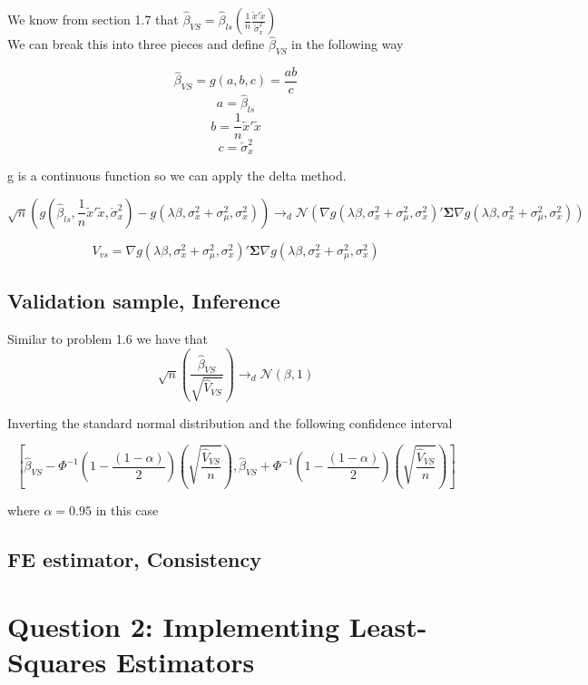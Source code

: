 \documentclass[11pt]{article}
\begin{document}
We know from section 1.7 that  $\hat{\beta}_{VS} = \hat{\beta}_{ls}\left(\frac{1}{n}\frac{\tilde{x}'\tilde{x}}{\check{\sigma}_x^2} \right)$ \\

We can break this into three pieces and define $\hat{\beta}_{VS}$ in the following way 

$$\hat{\beta}_{VS} = g(a,b,c) = \frac{ab}{c} $$
$$ a = \hat{\beta}_{ls} $$
$$ b = \frac{1}{n}\tilde{x}'\tilde{x} $$
$$ c = \check{\sigma}_x^2 $$

g is a continuous function so we can apply the delta method. 

$$ \sqrt{n} \left( g \left( \hat{\beta}_{ls}, \frac{1}{n}\tilde{x}'\tilde{x}, \check{\sigma}_x^2 \right) - g \left( \lambda \beta, \sigma_x^2 + \sigma_{\mu}^2, \sigma_x^2 \right) \right) \to_d 
\mathcal{N} \left( \nabla g \left( \lambda \beta, \sigma_x^2 + \sigma_{\mu}^2, \sigma_x^2 \right)' 
\bm{\Sigma} 
\nabla g \left( \lambda \beta, \sigma_x^2 + \sigma_{\mu}^2, \sigma_x^2 \right) \right) $$

$$ V_{vs} =  \nabla g \left( \lambda \beta, \sigma_x^2 + \sigma_{\mu}^2, \sigma_x^2 \right)' 
\bm{\Sigma} 
\nabla g \left( \lambda \beta, \sigma_x^2 + \sigma_{\mu}^2, \sigma_x^2 \right) $$

\subsection{Validation sample, Inference}

Similar to problem 1.6 we have that 
$$
\sqrt{n} \left( \frac{\hat{\beta}_{VS}}{\sqrt{\hat{V}_{VS} }} \right) \to_d \mathcal{N}(\beta,1)
$$


Inverting the standard normal distribution and the following confidence interval 

$$ \left[ \hat{\beta}_{VS} - \Phi^{-1} \left( 1 -\frac{(1-\alpha)}{2} \right) \left( \sqrt{\frac{\hat{V}_{VS} }{n}} \right),  \hat{\beta}_{VS} + \Phi^{-1} \left( 1 -\frac{(1-\alpha)}{2} \right) \left( \sqrt{\frac{\hat{V}_{VS} }{n}} \right) \right] $$

where $\alpha = 0.95$ in this case 

\subsection{FE estimator, Consistency}



\section{Question 2: Implementing Least-Squares Estimators}
\end{document}
